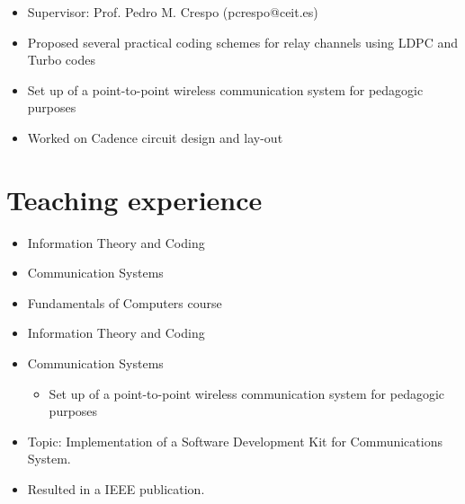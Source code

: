 \documentclass[11pt,a4paper,sans]{moderncv}        %
\begin{document}

\begin{itemize}
\item Supervisor: Prof. Pedro M. Crespo (pcrespo@ceit.es)
\item Proposed several practical coding schemes for relay channels using LDPC and Turbo codes
\item  Set up of a point-to-point wireless communication system for pedagogic purposes
\end{itemize}
\vspace{10pt}

\begin{itemize}
\item Worked on Cadence circuit design and lay-out
\end{itemize}

\section{Teaching experience}
\begin{itemize}
\item Information Theory and Coding
\item Communication Systems
\item Fundamentals of Computers course
\end{itemize}
\vspace{10pt}

\begin{itemize}
\item Information Theory and Coding
\item Communication Systems
\begin{itemize}
\item Set up of a point-to-point wireless communication system for pedagogic purposes
\end{itemize}
\end{itemize}
\vspace{10pt}

\begin{itemize}
\item {Topic:} Implementation of a Software Development Kit for Communications System.
\item Resulted in a IEEE publication.
\end{itemize}
\vspace{10pt}
\end{document}
